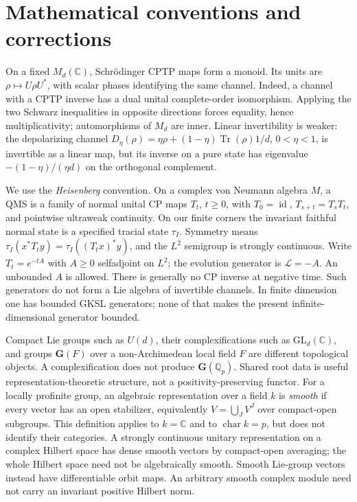 \documentclass[11pt]{article}
\theoremstyle{remark}\newtheorem{remark}[definition]{Remark}
\newcommand{\Tr}{\operatorname{Tr}}
\newcommand{\id}{\operatorname{id}}
\newcommand{\C}{\mathbb{C}}
\newcommand{\Q}{\mathbb{Q}}
\begin{document}
\section{Mathematical conventions and corrections}
On a fixed $M_d(\C)$, Schr\"odinger CPTP maps form a monoid. Its units are
$\rho\mapsto U\rho U^*$, with scalar phases identifying the same channel.
Indeed, a channel with a CPTP inverse has a dual unital complete-order
isomorphism. Applying the two Schwarz inequalities in opposite directions
forces equality, hence multiplicativity; automorphisms of $M_d$ are inner.
Linear invertibility is weaker: the depolarizing channel
$D_\eta(\rho)=\eta\rho+(1-\eta)\Tr(\rho)1/d$, $0<\eta<1$, is invertible
as a linear map, but its inverse on a pure state has eigenvalue
$-(1-\eta)/(\eta d)$ on the orthogonal complement.

We use the \emph{Heisenberg} convention. On a complex von Neumann algebra
$M$, a QMS is a family of normal unital CP maps $T_t$, $t\geq0$,
with $T_0=\id$, $T_{s+t}=T_sT_t$, and pointwise ultraweak continuity.
On our finite corners the invariant faithful normal state is a specified
tracial state $\tau_I$. Symmetry means
$\tau_I(x^*T_t y)=\tau_I((T_t x)^*y)$, and the $L^2$ semigroup is strongly
continuous. Write $T_t=e^{-tA}$ with $A\geq0$ selfadjoint on $L^2$;
the evolution generator is $\mathcal L=-A$. An unbounded $A$ is allowed.
There is generally no CP inverse at negative time. Such generators do not
form a Lie algebra of invertible channels. In finite dimension one has
bounded GKSL generators; none of that makes the present infinite-dimensional
generator bounded.

Compact Lie groups such as $U(d)$, their complexifications such as
$\mathrm{GL}_d(\C)$, and groups $\mathbf G(F)$ over a non-Archimedean local
field $F$ are different topological objects. A complexification does not
produce $\mathbf G(\Q_p)$. Shared root data is useful representation-theoretic
structure, not a positivity-preserving functor.
For a locally profinite group, an algebraic representation over a field $k$
is \emph{smooth} if every vector has an open stabilizer, equivalently
$V=\bigcup_J V^J$ over compact-open subgroups. This definition applies to
$k=\C$ and to $\operatorname{char}k=p$, but does not identify their categories.
A strongly continuous unitary representation on a complex Hilbert space
has dense smooth vectors by compact-open averaging; the whole Hilbert
space need not be algebraically smooth. Smooth Lie-group vectors instead
have differentiable orbit maps. An arbitrary smooth complex module need
not carry an invariant positive Hilbert norm.
\end{document}
